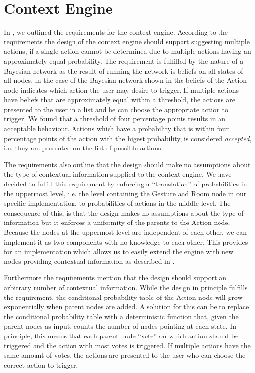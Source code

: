 \section{Context Engine}
\label{sec:design:context-engine}

In , we outlined the requirements for the context engine. According to the requirements the design of the context engine should support suggesting multiple actions, if a single action cannot be determined due to multiple actions having an approximately equal probability. The requirement is fulfilled by the nature of a Bayesian network as the result of running the network is beliefs on all states of all nodes. In the case of the Bayesian network shown in  the beliefs of the Action node indicates which action the user may desire to trigger.
If multiple actions have beliefs that are approximately equal within a threshold, the actions are presented to the user in a list and he can choose the appropriate action to trigger. We found that a threshold of four percentage points results in an acceptable behaviour. Actions which have a probability that is within four percentage points of the action with the higest probability, is considered \emph{accepted}, i.e. they are presented on the list of possible actions.

The requirements also outline that the design should make no assumptions about the type of contextual information supplied to the context engine. We have decided to fulfill this requirement by enforcing a ``translation'' of probabilities in the uppermost level, i.e. the level containing the Gesture and Room node in our specific implementation, to probabilities of actions in the middle level.
The consequence of this, is that the design makes no assumptions about the type of information but it enforces a uniformity of the parents to the Action node.
Because the nodes at the uppermost level are independent of each other, we can implement it as two components with no knowledge to each other. This provides for an implementation which allows us to easily extend the engine with new nodes providing contextual information as described in .

Furthermore the requirements mention that the design should support an arbitrary number of contextual information. While the design in principle fulfills the requirement, the conditional probability table of the Action node will grow exponentially when parent nodes are added.
A solution for this can be to replace the conditional probability table with a deterministic function that, given the parent nodes as input, counts the number of nodes pointing at each state. In principle, this means that each parent node ``vote'' on which action should be triggered and the action with most votes is triggered. If multiple actions have the same amount of votes, the actions are presented to the user who can choose the correct action to trigger.

